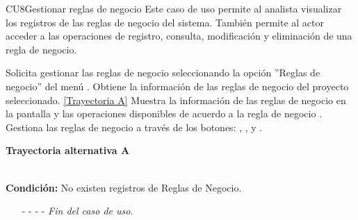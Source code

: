 	\begin{UseCase}{CU8}{Gestionar reglas de negocio}{
	Este caso de uso permite al analista visualizar los registros de las reglas de negocio del sistema.
	También permite al actor acceder a las operaciones de registro, consulta, modificación y eliminación de una regla de negocio.
	}
	
\end{UseCase}
\begin{UCtrayectoria}
	\UCpaso[\UCactor] Solicita gestionar las reglas de negocio seleccionando la opción ''Reglas de negocio'' del menú .
	\UCpaso[\UCsist] Obtiene la información de las reglas de negocio del proyecto seleccionado. \hyperlink{CU8:TAA}{[Trayectoria A]}
	\UCpaso[\UCsist] Muestra la información de las reglas de negocio en la pantalla  y las operaciones disponibles de acuerdo a la regla de negocio .\label{CU8-P4}
	\UCpaso[\UCactor] Gestiona las reglas de negocio a través de los botones: , \editar , \eliminar y . 
\end{UCtrayectoria}		
\hypertarget{CU8:TAA}{\textbf{Trayectoria alternativa A}}\\
\noindent \textbf{Condición:} No existen registros de Reglas de Negocio.
\begin{enumerate}
	\UCpaso[\UCsist] Muestra el mensaje  en la pantalla  para indicar que no hay registros de reglas de negocio para mostrar. \label{CU8-TA1}
	\UCpaso[\UCactor] Gestiona las reglas de negocio a través del botón: . 
	\item[- -] - - {\em {Fin del caso de uso}}.%
\end{enumerate}

